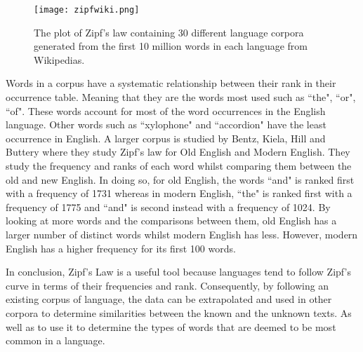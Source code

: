 \begin{figure}[!htb]
	\centering
	\texttt{[image: zipfwiki.png]}
	\caption{The plot of Zipf's law containing 30 different language corpora generated from the first 10 million words in each language from Wikipedias.}
	\label{fig:zipfwiki}
\end{figure}

Words in a corpus have a systematic relationship between their rank in their occurrence table. Meaning that they are the words most used such as ``the", ``or", ``of". These words account for most of the word occurrences in the English language. Other words such as ``xylophone" and ``accordion" have the least occurrence in English. A larger corpus is studied by Bentz, Kiela, Hill and Buttery \cite{BentzKielaHillButtery} where they study Zipf's law for Old English and Modern English. They study the frequency and ranks of each word whilst comparing them between the old and new English. In doing so, for old English, the words ``and" is ranked first with a frequency of 1731 whereas in modern English, ``the" is ranked first with a frequency of 1775 and ``and" is second instead with a frequency of 1024. By looking at more words and the comparisons between them, old English has a larger number of distinct words whilst modern English has less. However, modern English has a higher frequency for its first 100 words.

In conclusion, Zipf's Law is a useful tool because languages tend to follow Zipf's curve in terms of their frequencies and rank. Consequently, by following an existing corpus of language, the data can be extrapolated and used in other corpora to determine similarities between the known and the unknown texts. As well as to use it to determine the types of words that are deemed to be most common in a language.